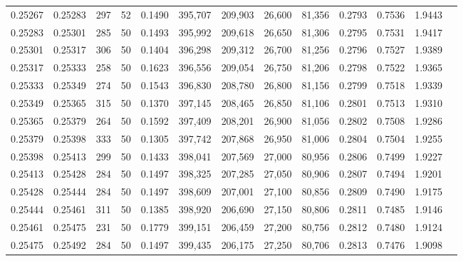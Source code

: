 \begin{tabular}{rrrrrrrrrrrrr}
0.25267 & 0.25283 &   297 &  52 &                                     0.1490 & 395,707 & 209,903 &  26,600 &  81,356 & 0.2793 & 0.7536 & 1.9443 \\
0.25283 & 0.25301 &   285 &  50 &                                     0.1493 & 395,992 & 209,618 &  26,650 &  81,306 & 0.2795 & 0.7531 & 1.9417 \\
0.25301 & 0.25317 &   306 &  50 &                                     0.1404 & 396,298 & 209,312 &  26,700 &  81,256 & 0.2796 & 0.7527 & 1.9389 \\
0.25317 & 0.25333 &   258 &  50 &                                     0.1623 & 396,556 & 209,054 &  26,750 &  81,206 & 0.2798 & 0.7522 & 1.9365 \\
0.25333 & 0.25349 &   274 &  50 &                                     0.1543 & 396,830 & 208,780 &  26,800 &  81,156 & 0.2799 & 0.7518 & 1.9339 \\
0.25349 & 0.25365 &   315 &  50 &                                     0.1370 & 397,145 & 208,465 &  26,850 &  81,106 & 0.2801 & 0.7513 & 1.9310 \\
0.25365 & 0.25379 &   264 &  50 &                                     0.1592 & 397,409 & 208,201 &  26,900 &  81,056 & 0.2802 & 0.7508 & 1.9286 \\
0.25379 & 0.25398 &   333 &  50 &                                     0.1305 & 397,742 & 207,868 &  26,950 &  81,006 & 0.2804 & 0.7504 & 1.9255 \\
0.25398 & 0.25413 &   299 &  50 &                                     0.1433 & 398,041 & 207,569 &  27,000 &  80,956 & 0.2806 & 0.7499 & 1.9227 \\
0.25413 & 0.25428 &   284 &  50 &                                     0.1497 & 398,325 & 207,285 &  27,050 &  80,906 & 0.2807 & 0.7494 & 1.9201 \\
0.25428 & 0.25444 &   284 &  50 &                                     0.1497 & 398,609 & 207,001 &  27,100 &  80,856 & 0.2809 & 0.7490 & 1.9175 \\
0.25444 & 0.25461 &   311 &  50 &                                     0.1385 & 398,920 & 206,690 &  27,150 &  80,806 & 0.2811 & 0.7485 & 1.9146 \\
0.25461 & 0.25475 &   231 &  50 &                                     0.1779 & 399,151 & 206,459 &  27,200 &  80,756 & 0.2812 & 0.7480 & 1.9124 \\
0.25475 & 0.25492 &   284 &  50 &                                     0.1497 & 399,435 & 206,175 &  27,250 &  80,706 & 0.2813 & 0.7476 & 1.9098 \\

\end{tabular}

